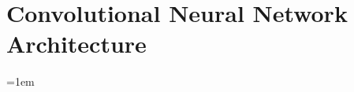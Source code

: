 \documentclass[
11pt, %
oneside, %
english, %
singlespacing, %
liststotoc, %
toctotoc, %
parskip, %
headsepline, %
]{MastersDoctoralThesis} %
\newcommand{\appendixinput}[1]{}
\begin{document}
\todo{}
\chapter{Convolutional Neural Network Architecture}
\appendixinput{cnnArchitectures.tex}


\emergencystretch=1em


\printbibliography[heading=bibintoc]

\end{document}
